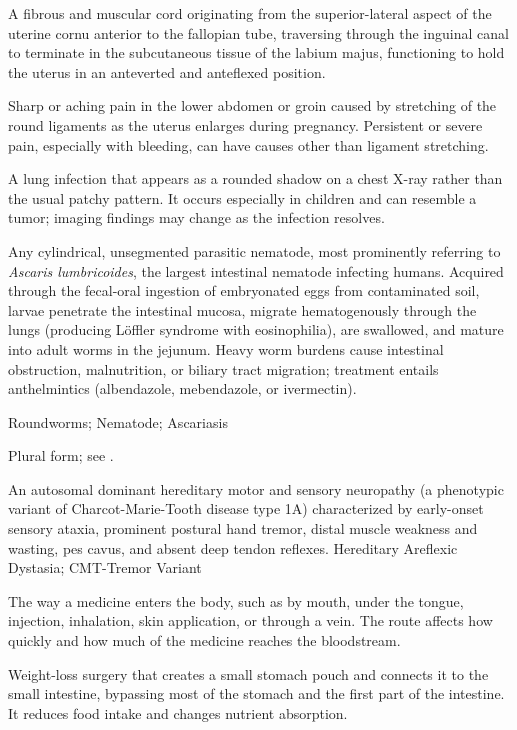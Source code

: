  A fibrous and muscular cord originating from the superior-lateral aspect of the uterine cornu anterior to the fallopian tube, traversing through the inguinal canal to terminate in the subcutaneous tissue of the labium majus, functioning to hold the uterus in an anteverted and anteflexed position.

 Sharp or aching pain in the lower abdomen or groin caused by stretching of the round ligaments as the uterus enlarges during pregnancy. Persistent or severe pain, especially with bleeding, can have causes other than ligament stretching.

 A lung infection that appears as a rounded shadow on a chest X-ray rather than the usual patchy pattern. It occurs especially in children and can resemble a tumor; imaging findings may change as the infection resolves.

 Any cylindrical, unsegmented parasitic nematode, most prominently referring to \textit{Ascaris lumbricoides}, the largest intestinal nematode infecting humans. Acquired through the fecal-oral ingestion of embryonated eggs from contaminated soil, larvae penetrate the intestinal mucosa, migrate hematogenously through the lungs (producing Löffler syndrome with eosinophilia), are swallowed, and mature into adult worms in the jejunum. Heavy worm burdens cause intestinal obstruction, malnutrition, or biliary tract migration; treatment entails anthelmintics (albendazole, mebendazole, or ivermectin).

\synonyms
Roundworms; Nematode; Ascariasis

 Plural form; see .

 An autosomal dominant hereditary motor and sensory neuropathy (a phenotypic variant of Charcot-Marie-Tooth disease type 1A) characterized by early-onset sensory ataxia, prominent postural hand tremor, distal muscle weakness and wasting, pes cavus, and absent deep tendon reflexes.
\synonyms
Hereditary Areflexic Dystasia; CMT-Tremor Variant

 The way a medicine enters the body, such as by mouth, under the tongue, injection, inhalation, skin application, or through a vein. The route affects how quickly and how much of the medicine reaches the bloodstream.

 Weight-loss surgery that creates a small stomach pouch and connects it to the small intestine, bypassing most of the stomach and the first part of the intestine. It reduces food intake and changes nutrient absorption.

